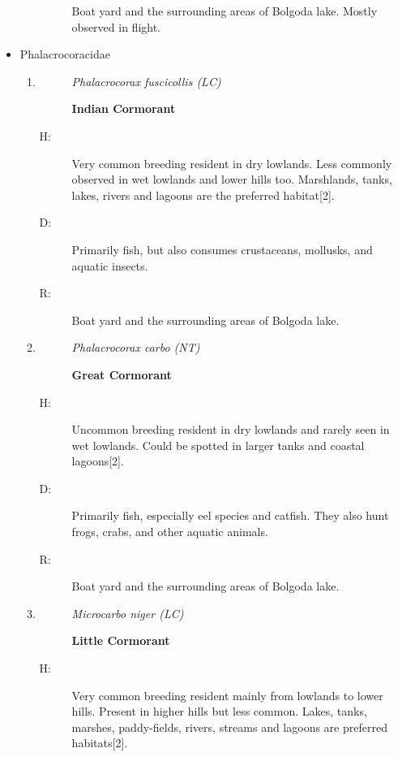 \begin{itemize}
\begin{enumerate}
\begin{description}
Boat yard and the surrounding areas of Bolgoda lake. Mostly observed in flight.%
\end{description}%
\end{enumerate}%
\item%
Phalacrocoracidae%
\begin{enumerate}%
\item%
\begin{description}%
\item[]%
\textit{Phalacrocorax fuscicollis (LC)}%
\item[]%
\textbf{Indian Cormorant}%
\end{description}%
\begin{description}%
\item[H: ]%
Very common breeding resident in dry lowlands. Less commonly observed in wet lowlands and lower hills too. Marshlands, tanks, lakes, rivers and lagoons are the preferred habitat{[}2{]}.%
\item[D: ]%
Primarily fish, but also consumes crustaceans, mollusks, and aquatic insects.%
\item[R: ]%
Boat yard and the surrounding areas of Bolgoda lake.%
\end{description}%
\item%
\begin{description}%
\item[]%
\textit{Phalacrocorax carbo (NT)}%
\item[]%
\textbf{Great Cormorant}%
\end{description}%
\begin{description}%
\item[H: ]%
Uncommon breeding resident in dry lowlands and rarely seen in wet lowlands. Could be spotted in larger tanks and coastal lagoons{[}2{]}.%
\item[D: ]%
Primarily fish, especially eel species and catfish. They also hunt frogs, crabs, and other aquatic animals.%
\item[R: ]%
Boat yard and the surrounding areas of Bolgoda lake.%
\end{description}%
\item%
\begin{description}%
\item[]%
\textit{Microcarbo niger (LC)}%
\item[]%
\textbf{Little Cormorant}%
\end{description}%
\begin{description}%
\item[H: ]%
Very common breeding resident mainly from lowlands to lower hills. Present in higher hills but less common. Lakes, tanks, marshes, paddy-fields, rivers, streams and lagoons are preferred habitats{[}2{]}.%

\end{description}
\end{enumerate}
\end{itemize}
